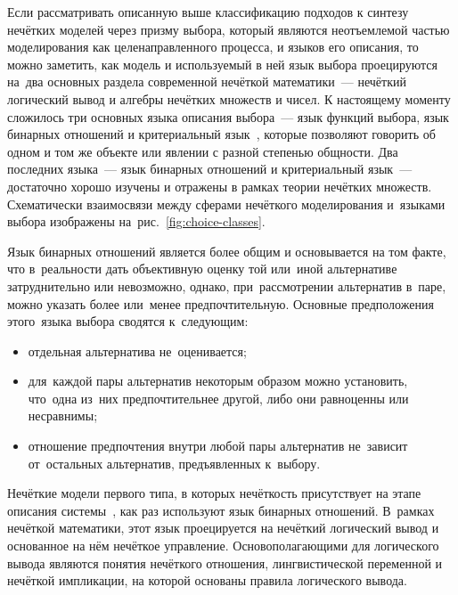 Если рассматривать описанную выше классификацию подходов к синтезу нечётких моделей через призму выбора, который являются неотъемлемой частью моделирования как целенаправленного процесса, и языков его описания, то можно заметить, как модель и используемый в ней язык выбора проецируются на~два основных раздела современной нечёткой математики~--- нечёткий логический вывод и алгебры нечётких множеств и чисел. К настоящему моменту сложилось три основных языка описания выбора~--- язык функций выбора, язык бинарных отношений и критериальный язык~\cite{Choice_Languages}, которые позволяют говорить об одном и том же объекте или явлении с разной степенью общности. Два последних языка~--- язык бинарных отношений и критериальный язык~--- достаточно хорошо изучены и отражены в рамках теории нечётких множеств. Схематически взаимосвязи между сферами нечёткого моделирования и~языками выбора изображены на~рис.~\ref{fig:choice-classes}.

\begin{figure}[t!]
\end{figure}

Язык бинарных отношений является более общим и основывается на том факте, что в~реальности дать объективную оценку той или~иной альтернативе затруднительно или невозможно, однако, при~рассмотрении альтернатив в~паре, можно указать более или~менее предпочтительную. Основные предположения этого~языка выбора сводятся к~следующим:
\begin{itemize}
	\item отдельная альтернатива не~оценивается;
	\item для~каждой пары альтернатив некоторым образом можно установить, что~одна из~них предпочтительнее другой, либо они равноценны или несравнимы;
	\item отношение предпочтения внутри любой пары альтернатив не~зависит от~остальных альтернатив, предъявленных к~выбору.
\end{itemize}

Нечёткие модели первого типа, в которых нечёткость присутствует на этапе описания системы~\cite{Choice_Languages}, как раз используют язык бинарных отношений. В~рамках нечёткой математики, этот язык проецируется на нечёткий логический вывод и основанное на нём нечёткое управление. Основополагающими для логического вывода являются понятия нечёткого отношения, лингвистической переменной и нечёткой импликации, на которой основаны правила логического вывода.

